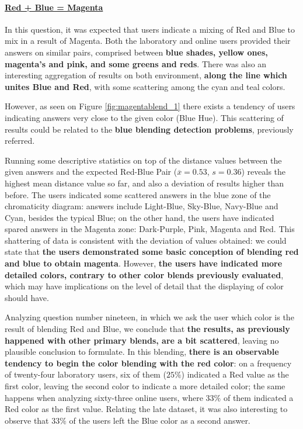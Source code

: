 \paragraph{\ul{Red + Blue = Magenta}}
%
In this question, it was expected that users indicate a mixing of Red and Blue to mix in a result of Magenta. Both the laboratory and online users provided their answers on similar pairs, comprised between \textbf{blue shades, yellow ones, magenta's and
pink, and some greens and reds}. There was also an interesting aggregation of results on both environment, \textbf{along the line which unites Blue and Red}, with some scattering among the cyan and teal colors.  \par
However, as seen on Figure \ref{fig:magentablend_1} there exists a tendency of users indicating answers very close to the given color (Blue Hue). This scattering of results could be related to the \textbf{blue blending
detection problems}, previously referred. \par
%
Running some descriptive statistics on top of the distance values between the given answers and the expected Red-Blue Pair ($\overline{x} = 0.53$, $s = 0.36$) reveals the highest mean distance value so far, and also a deviation of results higher than before.
The users indicated some scattered answers in the blue zone of the chromaticity diagram: answers include Light-Blue, Sky-Blue, Navy-Blue and Cyan, besides the typical Blue; on the other hand, the users have indicated spared answers in the Magenta zone: Dark-Purple,
Pink, Magenta and Red. This shattering of data is consistent with the deviation of values obtained: we could state that \textbf{the users demonstrated some basic conception of blending red and blue to obtain magenta}. However, \textbf{the users have indicated more
detailed colors, contrary to other color blends previously evaluated}, which may have implications on the level of detail that the displaying of color should have. \par
%
Analyzing question number nineteen, in which we ask the user which color is the result of blending Red and Blue, we conclude that \textbf{the results, as previously happened with other primary blends, are a bit scattered}, leaving no plausible conclusion to formulate.
In this blending, \textbf{there is an observable tendency to begin the color blending with the red color}: on a frequency of twenty-four laboratory users, six of them ($25\%$) indicated a Red value as the first color, leaving the second color to indicate a
more detailed color; the same happens when analyzing sixty-three online users, where $33\%$ of them indicated a Red color as the first value. Relating the late dataset, it was also interesting to observe that $33\%$ of the users left the Blue color as a second answer.
